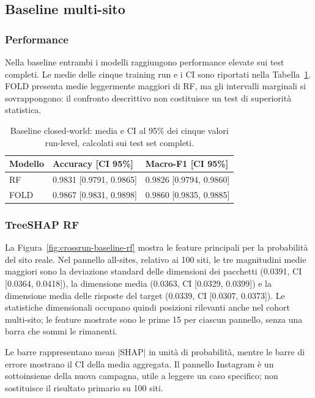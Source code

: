 \documentclass[11pt,a4paper]{article}
\begin{document}
\subsection{Baseline multi-sito}
\subsubsection{Performance}
Nella baseline entrambi i modelli raggiungono performance elevate sui test completi. Le medie delle cinque training run e i CI sono riportati nella Tabella~\ref{tab:crossrun-baseline-performance}. FOLD presenta medie leggermente maggiori di RF, ma gli intervalli marginali si sovrappongono: il confronto descrittivo non costituisce un test di superiorità statistica.

\begin{table}[htbp]
\centering\footnotesize
\caption{Baseline closed-world: media e CI al 95\% dei cinque valori run-level, calcolati sui test set completi.}
\label{tab:crossrun-baseline-performance}
\begin{tabular}{lll}
\toprule
Modello & Accuracy [CI 95\%] & Macro-F1 [CI 95\%] \\
\midrule
RF & 0.9831 [0.9791, 0.9865] & 0.9826 [0.9794, 0.9860] \\
FOLD & 0.9867 [0.9831, 0.9898] & 0.9860 [0.9835, 0.9885] \\
\bottomrule
\end{tabular}
\end{table}

\subsubsection{TreeSHAP RF}
La Figura~\ref{fig:crossrun-baseline-rf} mostra le feature principali per la probabilità del sito reale. Nel pannello all-sites, relativo ai 100 siti, le tre magnitudini medie maggiori sono la deviazione standard delle dimensioni dei pacchetti (0.0391, CI [0.0364, 0.0418]), la dimensione media (0.0363, CI [0.0329, 0.0399]) e la dimensione media delle risposte del target (0.0339, CI [0.0307, 0.0373]). Le statistiche dimensionali occupano quindi posizioni rilevanti anche nel cohort multi-sito; le feature mostrate sono le prime 15 per ciascun pannello, senza una barra che sommi le rimanenti.

Le barre rappresentano mean $|\mathrm{SHAP}|$ in unità di probabilità, mentre le barre di errore mostrano il CI della media aggregata. Il pannello Instagram è un sottoinsieme della nuova campagna, utile a leggere un caso specifico; non sostituisce il risultato primario su 100 siti.
\end{document}
